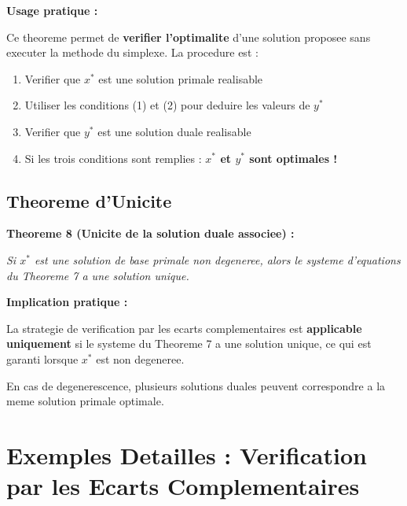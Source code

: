 \documentclass[12pt,a4paper]{article}
\begin{document}
\begin{astuce}
\textbf{Usage pratique :}

Ce theoreme permet de \textcolor{defvert}{\textbf{verifier l'optimalite}} d'une solution proposee sans executer la methode du simplexe. La procedure est :

\begin{enumerate}
    \item Verifier que $x^*$ est une solution primale realisable
    \item Utiliser les conditions (1) et (2) pour deduire les valeurs de $y^*$
    \item Verifier que $y^*$ est une solution duale realisable
    \item Si les trois conditions sont remplies : \textcolor{defvert}{\textbf{$x^*$ et $y^*$ sont optimales !}}
\end{enumerate}
\end{astuce}

\newpage
\subsection{Theoreme d'Unicite}

\begin{theoreme}
\textbf{Theoreme 8 (Unicite de la solution duale associee) :}

\textit{Si $x^*$ est une solution de base primale \textcolor{defvert}{non degeneree}, alors le systeme d'equations du Theoreme 7 a une \textcolor{defvert}{solution unique}.}
\end{theoreme}

\begin{important}
\textbf{Implication pratique :}

La strategie de verification par les ecarts complementaires est \textcolor{importantrouge}{\textbf{applicable uniquement}} si le systeme du Theoreme 7 a une solution unique, ce qui est garanti lorsque $x^*$ est non degeneree.

En cas de degenerescence, plusieurs solutions duales peuvent correspondre a la meme solution primale optimale.
\end{important}

\section{Exemples Detailles : Verification par les Ecarts Complementaires}
\end{document}
